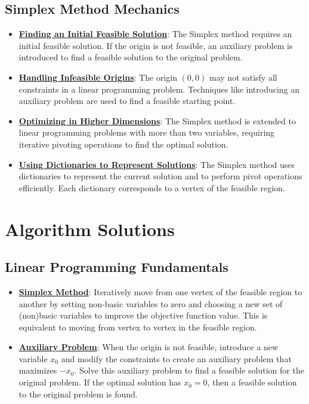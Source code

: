 \documentclass{article}%
\begin{document}
\subsection{Simplex Method Mechanics}%
\label{subsec:SimplexMethodMechanics}%
\begin{itemize}[leftmargin=*]%
\item \href{https://www.math.purdue.edu/~yipn/421/2024-08-27-ExSimplex.pdf#page=32}{\textbf{Finding an Initial Feasible Solution}}: The Simplex method requires an initial feasible solution. If the origin is not feasible, an auxiliary problem is introduced to find a feasible solution to the original problem.%
\item \href{https://www.math.purdue.edu/~yipn/421/2024-08-27-ExSimplex.pdf#page=30}{\textbf{Handling Infeasible Origins}}: The origin $(0, 0)$ may not satisfy all constraints in a linear programming problem. Techniques like introducing an auxiliary problem are used to find a feasible starting point.%
\item \href{https://www.math.purdue.edu/~yipn/421/2024-08-27-ExSimplex.pdf#page=17}{\textbf{Optimizing in Higher Dimensions}}: The Simplex method is extended to linear programming problems with more than two variables, requiring iterative pivoting operations to find the optimal solution.%
\item \href{https://www.math.purdue.edu/~yipn/421/2024-08-27-ExSimplex.pdf#page=26}{\textbf{Using Dictionaries to Represent Solutions}}: The Simplex method uses dictionaries to represent the current solution and to perform pivot operations efficiently. Each dictionary corresponds to a vertex of the feasible region.%
\end{itemize}

%
\section{Algorithm Solutions}%
\label{sec:AlgorithmSolutions}%
\subsection{Linear Programming Fundamentals}%
\label{subsec:LinearProgrammingFundamentals}%
\begin{itemize}[leftmargin=*]%
\item \href{https://www.math.purdue.edu/~yipn/421/2024-08-27-ExSimplex.pdf#page=6}{\textbf{Simplex Method}}: Iteratively move from one vertex of the feasible region to another by setting non-basic variables to zero and choosing a new set of (non)basic variables to improve the objective function value. This is equivalent to moving from vertex to vertex in the feasible region.%
\item \href{https://www.math.purdue.edu/~yipn/421/2024-08-27-ExSimplex.pdf#page=32}{\textbf{Auxiliary Problem}}: When the origin is not feasible, introduce a new variable $x_0$ and modify the constraints to create an auxiliary problem that maximizes $-x_0$. Solve this auxiliary problem to find a feasible solution for the original problem. If the optimal solution has $x_0 = 0$, then a feasible solution to the original problem is found.%
\end{itemize}
\end{document}
